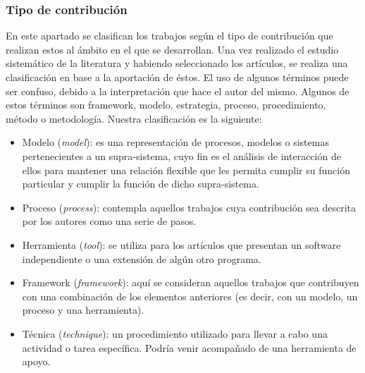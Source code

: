 \subsubsection{Tipo de contribución}
En este apartado se clasifican los trabajos según el tipo de contribución que realizan estos al ámbito en el que se desarrollan. Una vez realizado el estudio sistemático de la literatura y habiendo seleccionado los artículos, se realiza una clasificación en base a la aportación de éstos. El uso de algunos términos puede ser confuso, debido a la interpretación que hace el autor del mismo. Algunos de estos términos son framework, modelo, estrategia, proceso, procedimiento, método o metodología. Nuestra clasificación es la siguiente:
\begin{itemize}
\item Modelo (\emph{model}): es una representación de procesos, modelos o sistemas pertenecientes a un supra-sistema, cuyo fin es el análisis de interacción de ellos para mantener una relación flexible que les permita cumplir su función particular y cumplir la función de dicho supra-sistema.
\item Proceso (\emph{process}): contempla aquellos trabajos cuya contribución sea descrita por los autores como una serie de pasos.
\item Herramienta (\emph{tool}): se utiliza para los artículos que presentan un software independiente o una extensión de algún otro programa.
\item Framework (\emph{framework}): aquí se consideran aquellos trabajos que contribuyen con una combinación de los elementos anteriores (es decir, con un modelo, un proceso y una herramienta).
\item Técnica (\emph{technique}): un procedimiento utilizado para llevar a cabo una actividad o tarea específica. Podría venir acompañado de una herramienta de apoyo.
\end{itemize}

